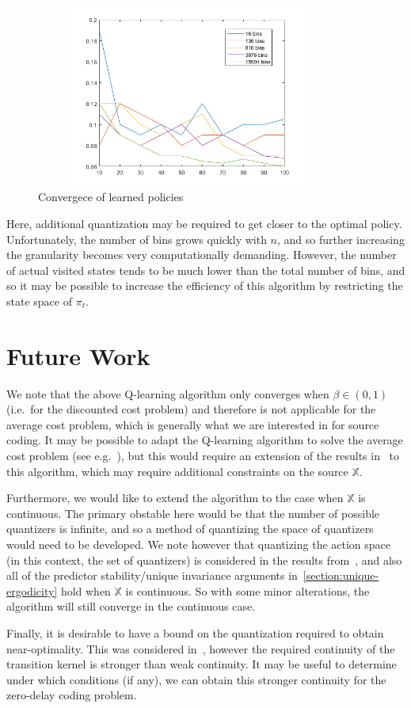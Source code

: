 \documentclass{article}
\begin{document}
\begin{figure}[H]
    \centering
    \includegraphics[height=6cm, width=10cm]{convergence_16.png}
    \caption{Convergece of learned policies}
\end{figure}

Here, additional quantization may be required to get closer to the optimal policy. Unfortunately, the number of bins grows quickly with \(n\), and so further increasing the granularity becomes very computationally demanding. However, the number of actual visited states tends to be much lower than the total number of bins, and so it may be possible to increase the efficiency of this algorithm by restricting the state space of \(\pi_t\).

\section{Future Work}
We note that the above Q-learning algorithm only converges when \( \beta \in (0,1) \) (i.e.\ for the discounted cost problem) and therefore is not applicable for the average cost problem, which is generally what we are interested in for source coding. It may be possible to adapt the Q-learning algorithm to solve the average cost problem (see e.g.\ \cite{Abounadi}), but this would require an extension of the results in~\cite{Kara} to this algorithm, which may require additional constraints on the source \( \mathbb{X} \).

Furthermore, we would like to extend the algorithm to the case when \( \mathbb{X} \) is continuous. The primary obstable here would be that the number of possible quantizers is infinite, and so a method of quantizing the space of quantizers would need to be developed. We note however that quantizing the action space (in this context, the set of quantizers) is considered in the results from~\cite{Kara}, and also all of the predictor stability/unique invariance arguments in~\ref{section:unique-ergodicity} hold when \( \mathbb{X} \) is continuous. So with some minor alterations, the algorithm will still converge in the continuous case.

Finally, it is desirable to have a bound on the quantization required to obtain near-optimality. This was considered in~\cite{Kara}, however the required continuity of the transition kernel is stronger than weak continuity. It may be useful to determine under which conditions (if any), we can obtain this stronger continuity for the zero-delay coding problem.

\newpage
\printbibliography
\end{document}
